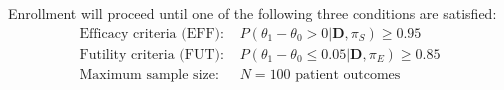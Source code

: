 \documentclass[12pt]{article}
\begin{document}
%				

Enrollment will proceed until one of the following three conditions are satisfied:
\begin{align*}
\text{Efficacy criteria (EFF): }&P(\theta_1-\theta_0>0|\mathbf{D},\pi_S)\geq 0.95\\
\text{Futility criteria (FUT): }&P(\theta_1-\theta_0 \leq 0.05|\mathbf{D},\pi_E)\geq 0.85\\
\text{Maximum sample size: }&N=100 \text{ patient outcomes}
\end{align*}
\end{document}
